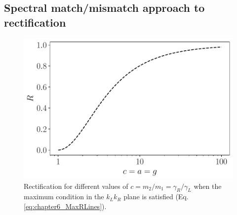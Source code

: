\subsection{Spectral match/mismatch approach to rectification}
%
%
%
\begin{figure}
  \center
  \includegraphics[width=0.75\linewidth]{Figures/CC.pdf}
  \caption{Rectification for different values of $c=m_2/m_1=\gamma_R/\gamma_L$ when the maximum condition in the $k_L k_R$ plane is satisfied (Eq. \eqref{eq:chapter6_MaxRLines}).}
  \label{fig:Fig_PerfectRectification}
\end{figure}

